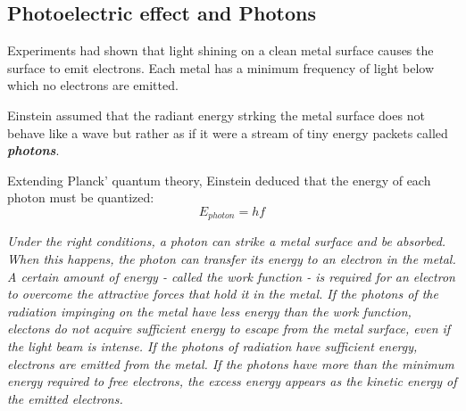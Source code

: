 \documentclass[12pt, a4paper]{report}
\newcommand{\impt}[1]{\textbf{\textit{#1}}}
\newcommand{\hii}{\subsection}
\begin{document}
    \hii{Photoelectric effect and Photons}
        \par Experiments had shown that light shining on a clean metal surface causes the surface
        to emit electrons. Each metal has a minimum frequency of light below which no electrons
        are emitted.
        \par Einstein assumed that the radiant energy strking the metal surface does not behave
        like a wave but rather as if it were a stream of tiny energy packets called \impt{photons}.
        \par Extending Planck' quantum theory, Einstein deduced that the energy of each photon
        must be quantized:
        \begin{equation}
            E_{photon} = hf
        \end{equation}
        \par \textit{Under the right conditions, a photon can strike a metal surface and be
        absorbed. When this happens, the photon can transfer its energy to an electron in
        the metal. A certain amount of energy - called the work function - is required for
        an electron to overcome the attractive forces that hold it in the metal. If the photons
        of the radiation impinging on the metal have less energy than the work function,
        electons do not acquire suﬀicient energy to escape from the metal surface, even if the
        light beam is intense. If the photons of radiation have sufficient energy, electrons
        are emitted from the metal. If the photons have more than the minimum energy required
        to free electrons, the excess energy appears as the kinetic energy of the emitted electrons.} 
\end{document}
